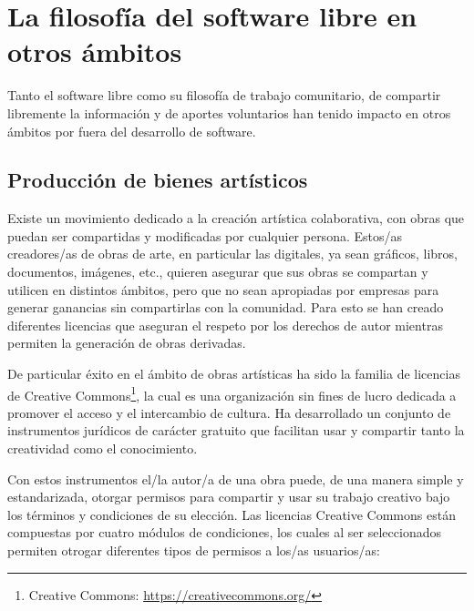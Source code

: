 \chapter{La filosofía del software libre en otros ámbitos}

Tanto el software libre como su filosofía de trabajo comunitario, de compartir libremente la información y de aportes voluntarios han tenido impacto en otros ámbitos por fuera del desarrollo de software.

\section{Producción de bienes artísticos}

Existe un movimiento dedicado a la creación artística colaborativa, con obras que puedan ser compartidas y modificadas por cualquier persona. Estos/as creadores/as de obras de arte, en particular las digitales, ya sean gráficos, libros, documentos, imágenes, etc., quieren asegurar que sus obras se compartan y utilicen en distintos ámbitos, pero que no sean apropiadas por empresas para generar ganancias sin compartirlas con la comunidad. Para esto se han creado diferentes licencias que aseguran el respeto por los derechos de autor mientras permiten la generación de obras derivadas. 

De particular éxito en el ámbito de obras artísticas ha sido la familia de licencias de Creative Commons\footnote{Creative Commons: \url{https://creativecommons.org/}}, la cual es una organización sin fines de lucro dedicada a promover el acceso y el intercambio de cultura. Ha desarrollado un conjunto de instrumentos jurídicos de carácter gratuito que facilitan usar y compartir tanto la creatividad como el conocimiento.

Con estos instrumentos el/la autor/a de una obra puede, de una manera simple y estandarizada, otorgar permisos para compartir y usar su trabajo creativo bajo los términos y condiciones de su elección. Las licencias Creative Commons están compuestas por cuatro módulos de condiciones, los cuales al ser seleccionados permiten otrogar diferentes tipos de permisos a los/as usuarios/as:

